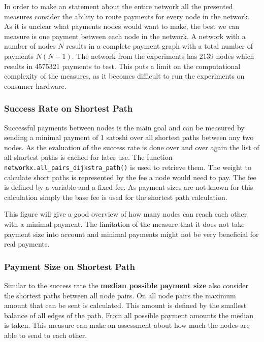 \documentclass[final]{fhnwreport}       %
\begin{document}
In order to make an statement about the entire network all the presented measures consider the ability to route payments for every node in the network. As it is unclear what payments nodes would want to make, the best we can measure is one payment between each node in the network. A network with a number of nodes $N$ results in a complete payment graph with a total number of payments $N(N-1)$. The network from the experiments has 2139 nodes which results in 4575321 payments to test. This puts a limit on the computational complexity of the measures, as it becomes difficult to run the experiments on consumer hardware.

\subsubsection{Success Rate on Shortest Path}
Successful payments between nodes is the main goal and can be measured by sending a minimal payment of 1 satoshi over all shortest paths between any two nodes. As the evaluation of the success rate is done over and over again the list of all shortest paths is cached for later use. The function \texttt{networkx.all_pairs_dijkstra_path()} is used to retrieve them. The weight to calculate short paths is represented by the fee a node would need to pay. The fee is defined by a variable and a fixed fee. As payment sizes are not known for this calculation simply the base fee is used for the shortest path calculation. 

This figure will give a good overview of how many nodes can reach each other with a minimal payment. The limitation of the measure that it does not take payment size into account and minimal payments might not be very beneficial for real payments.


\subsubsection{Payment Size on Shortest Path}
Similar to the success rate the \textbf{median possible payment size} also consider the shortest paths between all node pairs. On all node pairs the maximum amount that can be sent is calculated. This amount is defined by the smallest balance of all edges of the path. From all possible payment amounts the median is taken. This measure can make an assessment about how much the nodes are able to send to each other. 
\end{document}

